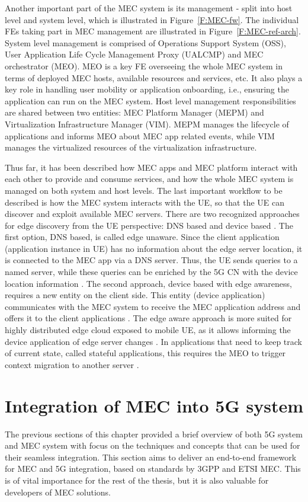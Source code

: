 \documentclass[12pt,a4paper,twoside]{report}
\begin{document}
Another important part of the MEC system is its management - split into host level and system level, which is illustrated in Figure~\ref{F:MEC-fw}. The individual FEs taking part in MEC management are illustrated in Figure~\ref{F:MEC-ref-arch}. System level management is comprised of Operations Support System (OSS), User Application Life Cycle Management Proxy (UALCMP) and MEC orchestrator (MEO). MEO is a key FE overseeing the whole MEC system in terms of deployed MEC hosts, available resources and services, etc. It also plays a key role in handling user mobility or application onboarding, i.e., ensuring the application can run on the MEC system. Host level management responsibilities are shared between two entities: MEC Platform Manager (MEPM) and Virtualization Infrastructure Manager (VIM). MEPM manages the lifecycle of applications and informs MEO about MEC app related events, while VIM manages the virtualized resources of the virtualization infrastructure. \cite{ETSI:GS:MEC003}

Thus far, it has been described how MEC apps and MEC platform interact with each other to provide and consume services, and how the whole MEC system is managed on both system and host levels. The last important workflow to be described is how the MEC system interacts with the UE, so that the UE can discover and exploit available MEC servers.  There are two recognized approaches for edge discovery from the UE perspective: DNS based and device based \cite{ETSI:wp36}. The first option, DNS based, is called edge unaware. Since the client application (application instance in UE) has no information about the edge server location, it is connected to the MEC app via a DNS server. Thus, the UE sends queries to a named server, while these queries can be enriched by the 5G CN with the device location information \cite{ETSI:wp36,ETSI:wp20}. The second approach, device based with edge awareness, requires a new entity on the client side. This entity (device application) communicates with the MEC system to receive the MEC application address and offers it to the client applications \cite{ETSI:wp20}. The edge aware approach is more suited for highly distributed edge cloud exposed to mobile UE, as it allows informing the device application of edge server changes \cite{ETSI:wp36}. In applications that need to keep track of current state, called stateful applications, this requires the MEO to trigger context migration to another server \cite{ETSI:GS:MEC003,ETSI:wp36}. 

\section{Integration of MEC into 5G system}
The previous sections of this chapter provided a brief overview of both 5G system and MEC system with focus on the techniques and concepts that can be used for their seamless integration. This section aims to deliver an end-to-end framework for MEC and 5G integration, based on standards by 3GPP and ETSI MEC. This is of vital importance for the rest of the thesis, but it is also valuable for developers of MEC solutions.
\end{document}
